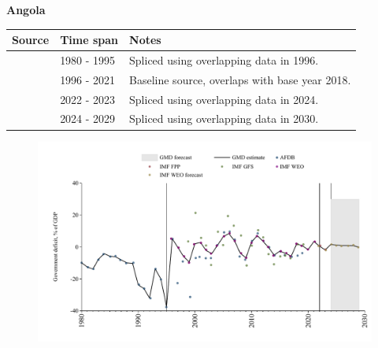 \documentclass[12pt,a4paper,landscape]{article}
\begin{document}
\begin{adjustbox}{max totalsize={\paperwidth}{\paperheight},center}
\begin{minipage}[t][\textheight][t]{\textwidth}
\vspace*{0.5cm}
{}
\begin{center}
{\Large\bfseries Angola}
\end{center}
\vspace{0.5cm}
\begin{table}[H]
\centering
\small
\begin{tabular}{|l|l|l|}
\hline
\textbf{Source} & \textbf{Time span} & \textbf{Notes} \\
\hline
\rowcolor{white}\cite{AFDB}& 1980 - 1995 &Spliced using overlapping data in 1996.\\
\rowcolor{lightgray}\cite{IMF_WEO}& 1996 - 2021 &Baseline source, overlaps with base year 2018.\\
\rowcolor{white}\cite{IMF_FPP}& 2022 - 2023 &Spliced using overlapping data in 2024.\\
\rowcolor{lightgray}\cite{IMF_WEO_forecast}& 2024 - 2029 &Spliced using overlapping data in 2030.\\
\hline
\end{tabular}
\end{table}
\begin{figure}[H]
\centering
\includegraphics[width=\textwidth,height=0.6\textheight,keepaspectratio]{graphs/AGO_govdef_GDP.pdf}
\end{figure}
\end{minipage}
\end{adjustbox}
\end{document}
